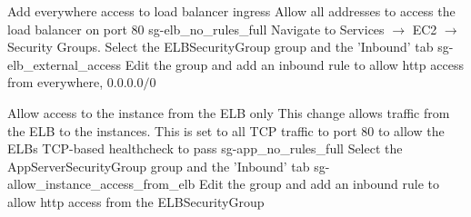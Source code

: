 \FloatBarrier

{Add everywhere access to load balancer ingress}
{
Allow all addresses to access the load balancer on port 80
}
{
	\imagefigdual
	{sg-elb_no_rules_full}
 	{ Navigate to Services  $\rightarrow$ EC2  $\rightarrow$ Security Groups. Select the ELBSecurityGroup group and the 'Inbound' tab}
	{sg-elb_external_access}
	{Edit the group and add an inbound rule to allow http access from everywhere, $0.0.0.0/0$}
}


\FloatBarrier


{Allow access to the instance from the ELB only}
{This change allows traffic from the ELB to the instances. This is set to all TCP traffic to port 80 to allow the ELBs TCP-based healthcheck to pass}
{
{
	\imagefigdual
	{sg-app_no_rules_full}
	{Select the AppServerSecurityGroup group and the 'Inbound' tab}
	{sg-allow_instance_access_from_elb}
	{Edit the group and add an inbound rule to allow http access from the ELBSecurityGroup}
}
}

\FloatBarrier
